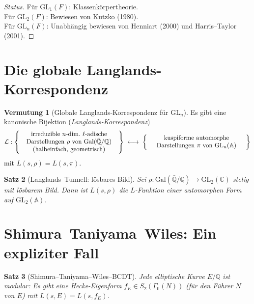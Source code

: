 \documentclass[12pt,a4paper]{amsart}
\newtheorem{theorem}{Satz}[section]
\theoremstyle{definition}
\newtheorem{conjecture}[theorem]{Vermutung}
\newcommand{\Q}{\mathbb{Q}}
\newcommand{\C}{\mathbb{C}}
\newcommand{\A}{\mathbb{A}}
\newcommand{\GL}{\mathrm{GL}}
\newcommand{\GQ}{\mathrm{Gal}(\bar{\Q}/\Q)}
\begin{document}
\begin{proof}[Status]
Für $\GL_1(F)$: Klassenkörpertheorie. \\
Für $\mathrm{GL}_2(F)$: Bewiesen von Kutzko (1980). \\
Für $\mathrm{GL}_n(F)$: Unabhängig bewiesen von Henniart (2000) und Harris--Taylor (2001).
\end{proof}

\section{Die globale Langlands-Korrespondenz}

\begin{conjecture}[Globale Langlands-Korrespondenz für $\GL_n$]
\label{conj:globale_langlands}
Es gibt eine kanonische Bijektion (\emph{Langlands-Korrespondenz})
\[
  \mathcal{L} :
  \left\{\parbox{5.5cm}{\centering irreduzible $n$-dim.\ $\ell$-adische Darstellungen $\rho$
  von $\GQ$ (halbeinfach, geometrisch)}\right\}
  \;\longleftrightarrow\;
  \left\{\parbox{5.5cm}{\centering kuspiforme automorphe Darstellungen $\pi$
  von $\GL_n(\mathbb{A})$}\right\}
\]
mit $L(s, \rho) = L(s, \pi)$.
\end{conjecture}

\begin{theorem}[Langlands--Tunnell: lösbares Bild]
\label{thm:langlands_tunnell}
Sei $\rho : \GQ \to \GL_2(\C)$ stetig mit lösbarem Bild.  Dann ist $L(s, \rho)$
die $L$-Funktion einer automorphen Form auf $\GL_2(\A)$.
\end{theorem}

\section{Shimura--Taniyama--Wiles: Ein expliziter Fall}

\begin{theorem}[Shimura--Taniyama--Wiles--BCDT]
\label{thm:stw}
Jede elliptische Kurve $E/\Q$ ist \emph{modular}: Es gibt eine Hecke-Eigenform
$f_E \in S_2(\Gamma_0(N))$ (für den Führer $N$ von $E$) mit $L(s, E) = L(s, f_E)$.
\end{theorem}
\end{document}
